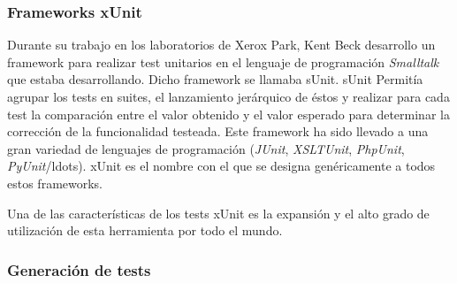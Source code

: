 \subsubsection*{Frameworks xUnit}
\label{ap2:sec:xUnit}

Durante su trabajo en los laboratorios de Xerox Park, Kent Beck desarrollo un framework para realizar test unitarios en el lenguaje de programaci\'on {\it Smalltalk} que estaba desarrollando. Dicho framework se llamaba sUnit. sUnit Permit\'ia agrupar los tests en suites, el lanzamiento jer\'arquico de \'estos y realizar para cada test la comparaci\'on entre el valor obtenido y el valor esperado para determinar la correcci\'on de la funcionalidad testeada. Este framework ha sido llevado a una gran variedad de lenguajes de programaci\'on ({\it JUnit}, {\it XSLTUnit}, {\it PhpUnit}, {\it PyUnit}/ldots). xUnit es el nombre con el que se designa gen\'ericamente a todos estos frameworks.

Una de las caracter\'isticas de los tests xUnit es la expansi\'on y el alto grado de utilizaci\'on de esta herramienta por todo el mundo.



\subsubsection*{Generaci\'on de tests}
\label{ap2:sec:test}

